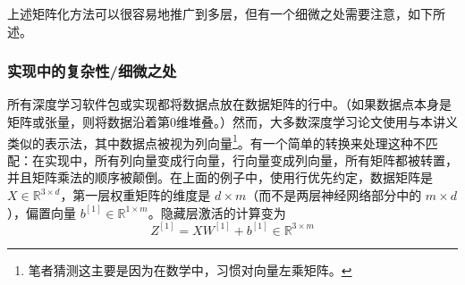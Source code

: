 上述矩阵化方法可以很容易地推广到多层，但有一个细微之处需要注意，如下所述。

\subsubsection*{实现中的复杂性/细微之处}

所有深度学习软件包或实现都将数据点放在数据矩阵的行中。（如果数据点本身是矩阵或张量，则将数据沿着第0维堆叠。）然而，大多数深度学习论文使用与本讲义类似的表示法，其中数据点被视为列向量\footnote{笔者猜测这主要是因为在数学中，习惯对向量左乘矩阵。}。有一个简单的转换来处理这种不匹配：在实现中，所有列向量变成行向量，行向量变成列向量，所有矩阵都被转置，并且矩阵乘法的顺序被颠倒。在上面的例子中，使用行优先约定，数据矩阵是 $X \in \mathbb{R}^{3 \times d}$，第一层权重矩阵的维度是 $d \times m$（而不是两层神经网络部分中的 $m \times d$），偏置向量 $b^{[1]} \in \mathbb{R}^{1 \times m}$。隐藏层激活的计算变为
\begin{equation}
    Z^{[1]} = XW^{[1]} + b^{[1]} \in \mathbb{R}^{3 \times m} \label{eq:7.84}
\end{equation}